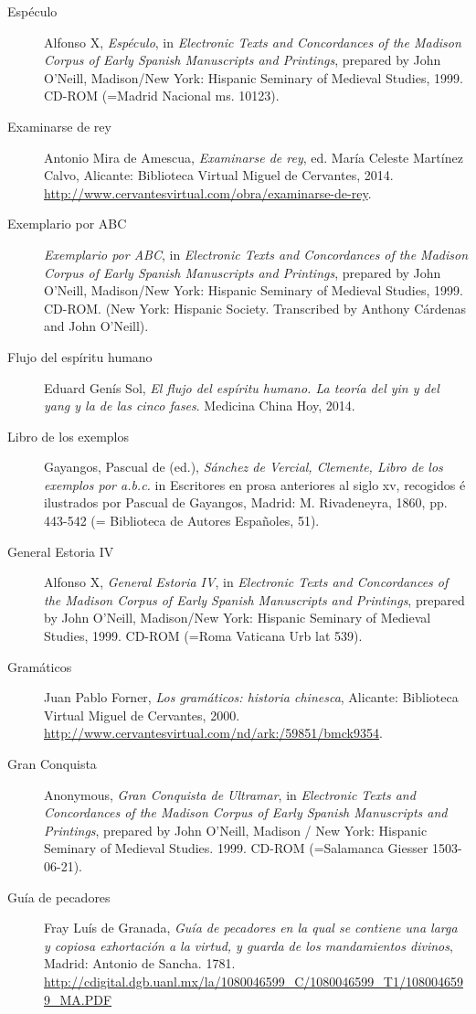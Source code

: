 \begin{flushleft}
\begin{description}
\item[Espéculo]Alfonso X, \textit{Espéculo}, in \textit{Electronic Texts and Concordances of the Madison Corpus of Early Spanish Manuscripts and Printings}, prepared by John O’Neill, Madison/New York: Hispanic Seminary of Medieval Studies, 1999. CD-ROM (=Madrid Nacional ms. 10123).
\item[Examinarse de rey]Antonio Mira de Amescua, \textit{Examinarse de rey}, ed. María Celeste Martínez Calvo, Alicante: Biblioteca Virtual Miguel de Cervantes, 2014. \url{http://www.cervantesvirtual.com/obra/examinarse-de-rey}.
\item[Exemplario por ABC]\textit{Exemplario por ABC}, in \textit{Electronic Texts and Concordances of the Madison Corpus of Early Spanish Manuscripts and Printings}, prepared by John O’Neill, Madison/New York: Hispanic Seminary of Medieval Studies, 1999. CD-ROM. (New York: Hispanic Society. Transcribed by Anthony Cárdenas and John O'Neill).
\item[Flujo del espíritu humano]Eduard Genís Sol, \textit{El flujo del espíritu humano. La teoría del yin y del yang y la de las cinco fases}. Medicina China Hoy, 2014.
\item[Libro de los exemplos]Gayangos, Pascual de (ed.), \textit{Sánchez de Vercial, Clemente, Libro de los exemplos por a.b.c.} in Escritores en prosa anteriores al siglo xv, recogidos é ilustrados por Pascual de Gayangos, Madrid: M. Rivadeneyra, 1860, pp. 443-542 (= Biblioteca de Autores Españoles, 51).
\item[General Estoria IV]Alfonso X, \textit{General Estoria IV}, in \textit{Electronic Texts and Concordances of the Madison Corpus of Early Spanish Manuscripts and Printings}, prepared by John O’Neill, Madison/New York: Hispanic Seminary of Medieval Studies, 1999. CD-ROM (=Roma Vaticana Urb lat 539).
\item[Gramáticos]Juan Pablo Forner, \textit{Los gramáticos: historia chinesca}, Alicante: Biblioteca Virtual Miguel de Cervantes, 2000. \url{http://www.cervantesvirtual.com/nd/ark:/59851/bmck9354}.
\item[Gran Conquista]Anonymous, \textit{Gran Conquista de Ultramar}, in \textit{Electronic Texts and Concordances of the Madison Corpus of Early Spanish Manuscripts and Printings}, prepared by John O’Neill, Madison / New York: Hispanic Seminary of Medieval Studies. 1999. CD-ROM (=Salamanca Giesser 1503-06-21).
\item[Guía de pecadores]Fray Luís de Granada, \textit{Guía de pecadores en la qual se contiene una larga y copiosa exhortación a la virtud, y guarda de los mandamientos divinos}, Madrid: Antonio de Sancha. 1781. \url{http://cdigital.dgb.uanl.mx/la/1080046599_C/1080046599_T1/1080046599_MA.PDF}

\end{description}
\end{flushleft}
